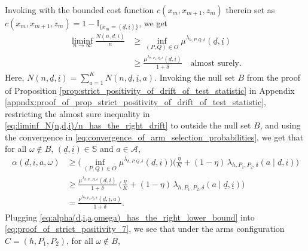 Invoking \cite[Lemma 2.10]{borkar1982identification} with the bounded cost function $c(x_m, x_{m+1}, z_m)$ therein set as $c(x_m, x_{m+1}, z_m)=1-\mathbb{I}_{\{x_m = (\underline{d}, \underline{i})\}}$, we get
\begin{align}
	\liminf\limits_{n\to \infty}\frac{N(n, \underline{d}, \underline{i})}{n} &\geq \inf\limits_{(P, Q)\in O} \mu^{\lambda_{h, P, Q, \delta}}(\underline{d}, \underline{i}) \nonumber\\
	 & \geq \frac{\mu^{\lambda_{h, P_1, P_2, \delta}}(\underline{d}, \underline{i})}{1+\delta}\quad \text{almost surely}.
	\label{eq:liminf_N(n,d,i)/n_has_the_right_drift}
\end{align}
Here, $N(n, \underline{d}, \underline{i})=\sum\limits_{a=1}^{K} N(n, \underline{d}, \underline{i}, a)$. Invoking the null set $B$ from the proof of Proposition \ref{prop:strict_positivity_of_drift_of_test_statistic} in Appendix \ref{appndx:proof_of_prop_strict_positivity_of_drift_of_test_statistic}, restricting the almost sure inequality in \eqref{eq:liminf_N(n,d,i)/n_has_the_right_drift} to outside the null set $B$, and using the convergence in \eqref{eq:convergence_of_arm_selection_probabilities}, we get that for all $\omega\notin B$, $(\underline{d}, \underline{i})\in \mathbb{S}$ and $a\in \mathcal{A}$,
\begin{align}
	\alpha(\underline{d}, \underline{i}, a, \omega)
	&\geq \bigg(\inf\limits_{(P, Q)\in O} \mu^{\lambda_{h, P, Q, \delta}}(\underline{d}, \underline{i}) \bigg)\bigg(\frac{\eta}{K} + (1-\eta)\, \lambda_{h, P_1, P_2, \delta}(a\mid \underline{d}, \underline{i})\bigg)\nonumber\\
	&\geq \frac{\mu^{\lambda_{h, P_1, P_2, \delta}}(\underline{d}, \underline{i})}{1+\delta}~\bigg(\frac{\eta}{K} + (1-\eta)\, \lambda_{h, P_1, P_2, \delta}(a\mid \underline{d}, \underline{i})\bigg)\nonumber\\
	&= \frac{\nu^{\lambda_{h, P_1, P_2, \delta}}(\underline{d}, \underline{i}, a)}{1+\delta}.
	\label{eq:alpha(d,i,a,omega)_has_the_right_lower_bound}
\end{align}
Plugging \eqref{eq:alpha(d,i,a,omega)_has_the_right_lower_bound} into \eqref{eq:proof_of_strict_positivity_7}, we see that under the arms configuration $C=(h, P_1, P_2)$, for all $\omega\notin B$,
